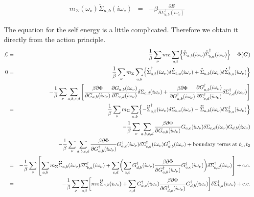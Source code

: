 \documentclass[11pt,a4paper]{report}
\begin{document}
\begin{eqnarray*}
m_\Sigma(\omega_\nu)\ddot{\Sigma}_{a,b}(i\omega_\nu)
&=&-\beta\frac{\partial{E}}
{\partial\Sigma^\dagger_{a,b}(i\omega_\nu)}
\end{eqnarray*}

The equation for the self energy is a little complicated. Therefore we
obtain it directly from the action principle.
\begin{eqnarray*}
\mathcal{L}&=&\frac{1}{\beta}\sum_\nu m_\Sigma
\sum_{a,b}\Bigl\lbrace
\dot{\Sigma}_{a,b}(i\omega_\nu)
\dot{\Sigma}^\dagger_{b,a}(i\omega_\nu)\Bigr\rbrace
-\Phi(\mat{G})
\\
0&=&\frac{1}{\beta}\sum_\nu
m_\Sigma\sum_{a,b}\Bigl\lbrace
\dot{\Sigma}_{a,b}^\dagger(i\omega_\nu)
\delta\dot{\Sigma}_{b,a}(i\omega_\nu)
+\dot{\Sigma}_{a,b}(i\omega_\nu)
\delta\dot{\Sigma}_{b,a}^\dagger(i\omega_\nu)
\Bigr\rbrace
\nonumber\\
&&-\frac{1}{\beta}\sum_\nu
\sum_{a,b,c,d}
\left[
\frac{\beta\partial\Phi}{\partial G_{a,b}(i\omega_\nu)}
\frac{\partial G_{a,b}(i\omega_\nu)}{\partial\Sigma_{c,d}(i\omega_\nu)}
\delta\Sigma_{c,d}(i\omega_\nu)
+\frac{\beta\partial\Phi}{\partial G^\dagger_{a,b}(i\omega_\nu)}
\frac{\partial G^\dagger_{a,b}(i\omega_\nu)}
{\partial\Sigma^\dagger_{c,d}(i\omega_\nu)}
\delta\Sigma^\dagger_{c,d}(i\omega_\nu)
\right]
\nonumber\\
%
&=&\frac{1}{\beta}\sum_\nu 
m_\Sigma\sum_{a,b}\Bigl\lbrace
-\ddot{\Sigma}_{a,b}^\dagger(i\omega_\nu)
\delta\Sigma_{b,a}(i\omega_\nu)
-\ddot{\Sigma}_{a,b}(i\omega_\nu)
\delta\Sigma_{b,a}^\dagger(i\omega_\nu)
\Bigr\rbrace
\nonumber\\
&&-\frac{1}{\beta}\sum_\nu
\sum_{a,b,c,d}
\frac{\beta\partial\Phi}{\partial G_{a,b}(i\omega_\nu)}
G_{a,c}(i\omega_\nu)\delta\Sigma_{c,d}(i\omega_\nu)G_{d,b}(i\omega_\nu)
\nonumber\\
&&-\frac{1}{\beta}\sum_\nu
\sum_{a,b,c,d}
\frac{\beta\partial\Phi}{\partial G^\dagger_{a,b}(i\omega_\nu)}
G^\dagger_{a,c}(i\omega_\nu)\delta\Sigma^\dagger_{c,d}(i\omega_\nu)
G^\dagger_{d,b}(i\omega_\nu)
+\text{boundary terms at $t_1,t_2$}
%
\nonumber\\
&=&-\frac{1}{\beta}\sum_\nu 
\left[
\sum_{a,b}
m_\Sigma\ddot{\Sigma}_{a,b}(i\omega_\nu)
\delta\Sigma^\dagger_{b,a}(i\omega_\nu)
+
\sum_{c,d}\biggl(
\sum_{a,b}
G^\dagger_{d,b}(i\omega_\nu)
\frac{\beta\partial\Phi}{\partial G^\dagger_{a,b}(i\omega_\nu)}
G^\dagger_{a,c}(i\omega_\nu)\biggr)
\delta\Sigma^\dagger_{c,d}(i\omega_\nu)\right]+\text{c.c.}
\nonumber\\
%
&=&-\frac{1}{\beta}\sum_\nu \sum_{a,b}
\biggl[m_\Sigma
\ddot{\Sigma}_{a,b}(i\omega_\nu)
+
\sum_{c,d}
G^\dagger_{a,c}(i\omega_\nu)
\frac{\beta\partial\Phi}{\partial G^\dagger_{d,c}(i\omega_\nu)}
G^\dagger_{d,b}(i\omega_\nu)
\biggr]\delta\Sigma^\dagger_{b,a}(i\omega_\nu)+\text{c.c.}
\end{eqnarray*}
\end{document}
